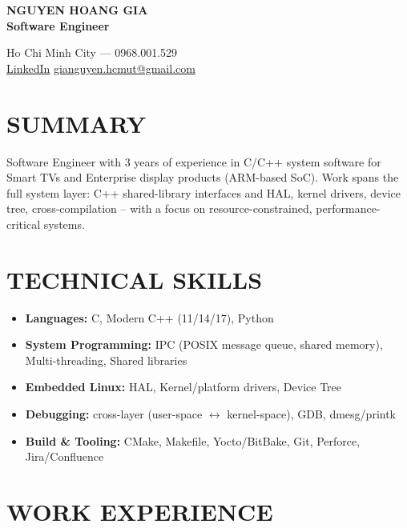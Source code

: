 \documentclass[a4paper,10pt]{article}
\begin{document}
\pagestyle{empty}

\begin{minipage}[t]{0.55\textwidth}
    {\LARGE \textbf{NGUYEN HOANG GIA}} \\[5pt]
    {\large \textbf{Software Engineer}}
\end{minipage}%
\begin{minipage}[t]{0.45\textwidth}
    \raggedleft
    \vspace{2pt}
    Ho Chi Minh City --- 0968.001.529 \\
    \href{https://www.linkedin.com/in/gia-nguyen-6a007b294/}{LinkedIn} \textbar{} \href{mailto:gianguyen.hcmut@gmail.com}{gianguyen.hcmut@gmail.com}
\end{minipage}

\vspace{4pt}

\section*{SUMMARY}
Software Engineer with 3 years of experience in C/C++ system software for Smart TVs and Enterprise display products (ARM-based SoC). 
Work spans the full system layer: C++ shared-library interfaces and HAL, kernel drivers, device tree, cross-compilation -- with a focus on 
resource-constrained, performance-critical systems.

\section*{TECHNICAL SKILLS}
\begin{itemize}
    \item \textbf{Languages:} C, Modern C++ (11/14/17), Python
    \item \textbf{System Programming:} IPC (POSIX message queue, shared memory),
    Multi-threading, Shared libraries
    \item \textbf{Embedded Linux:} HAL, Kernel/platform drivers, Device Tree
    \item \textbf{Debugging:} cross-layer (user-space $\leftrightarrow$ kernel-space), GDB, dmesg/printk
    \item \textbf{Build \& Tooling:} CMake, Makefile, Yocto/BitBake, Git, Perforce, Jira/Confluence
\end{itemize}

\section*{WORK EXPERIENCE}
\end{document}
